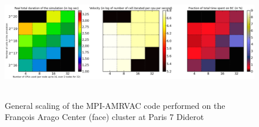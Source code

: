 \documentclass[
    a4paper, 
    12pt, onecolumn,
]{article}
\begin{document}
 \begin{figure}
\centering
 \includegraphics[width=14cm,height=5cm]{Scaling_node_14_15_unthreaded.png} 
 \caption{General scaling of the MPI-AMRVAC code performed on the Fran\c cois Arago Center ({\sc fac}e) cluster at Paris 7 Diderot} 
 \label{fig:scaling_FACe}
\end{figure}
\end{document}
